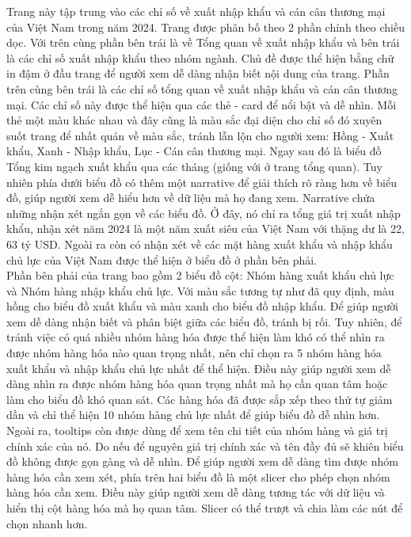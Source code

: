 \documentclass[a4paper]{report}
\begin{document}
{{Trang này tập trung vào các chỉ số về xuất nhập khẩu và cán cân thương mại của Việt Nam trong năm 2024. Trang được phân bố theo 2 phần chính theo chiều dọc.
Với trên cùng phần bên trái là về Tổng quan về xuất nhập khẩu và bên trái là các chỉ số xuất nhập khẩu theo nhóm ngành. Chủ đề được thể hiện bằng chữ in đậm ở đầu trang để người xem dễ dàng nhận biết nội dung của trang.
Phần trên cùng bên trái là các chỉ số tổng quan về xuất nhập khẩu và cán cân thương mại. Các chỉ số này được thể hiện qua các thẻ - card để nổi bật và dễ nhìn. Mỗi thẻ một màu khác nhau và đây cũng là màu sắc đại diện cho chỉ số đó xuyên suốt trang để nhất quán về màu sắc, tránh lẫn lộn cho người xem: Hồng - Xuất khẩu, Xanh - Nhập khẩu, Lục - Cán cân thương mại.
Ngay sau đó là biểu đồ Tổng kim ngạch xuất khẩu qua các tháng (giống với ở trang tổng quan). Tuy nhiên phía dưới biểu đồ có thêm một narrative để giải thích rõ ràng hơn về biểu đồ, giúp người xem dễ hiểu hơn về dữ liệu mà họ đang xem.
Narrative chứa những nhận xét ngắn gọn về các biểu đồ. Ở đây, nó chỉ ra tổng giá trị xuất nhập khẩu, nhận xét năm 2024 là một năm xuất siêu của Việt Nam với thặng dư là 22, 63 tỷ USD. Ngoài ra còn có nhận xét về các mặt hàng xuất khẩu và nhập khẩu chủ lực của Việt Nam được thể hiện ở biểu đồ ở phần bên phải.\\

Phần bên phải của trang bao gồm 2 biểu đồ cột: Nhóm hàng xuất khẩu chủ lực và Nhóm hàng nhập khẩu chủ lực. Với màu sắc tương tự như đã quy định, màu hồng cho biểu đồ xuất khẩu và màu xanh cho biểu đồ nhập khẩu. Để giúp người xem dễ dàng nhận biết và phân biệt giữa các biểu đồ, tránh bị rối.
Tuy nhiên, để tránh việc có quá nhiều nhóm hàng hóa được thể hiện làm khó có thể nhìn ra được nhóm hàng hóa nào quan trọng nhất, nên chỉ chọn ra 5 nhóm hàng hóa xuất khẩu và nhập khẩu chủ lực nhất để thể hiện. Điều này giúp người xem dễ dàng nhìn ra được nhóm hàng hóa quan trọng nhất mà họ cần quan tâm hoặc làm cho biểu đồ khó quan sát. Các hàng hóa đã được sắp xếp
theo thứ tự giảm dần và chỉ thể hiện 10 nhóm hàng chủ lực nhất để giúp biểu đồ dễ nhìn hơn. Ngoài ra, tooltips còn được dùng để xem tên chi tiết của nhóm hàng và giá trị chính xác của nó. Do nếu để nguyên giá trị chính xác và tên đầy đủ sẽ khiên biểu đồ không được gọn gàng và dễ nhìn.
Để giúp người xem dễ dàng tìm được nhóm hàng hóa cần xem xét, phía trên hai biểu đồ là một slicer cho phép chọn nhóm hàng hóa cần xem. Điều này giúp người xem dễ dàng tương tác với dữ liệu và hiển thị cột hàng hóa mà họ quan tâm. Slicer có thể trượt và chia làm các nút để chọn nhanh hơn.\\

}}
\end{document}
